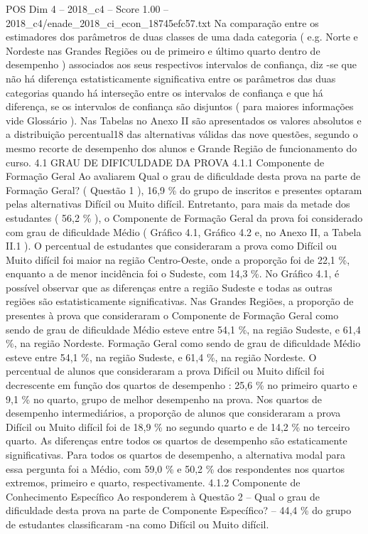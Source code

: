 \begin{textsample}{POS Dim 4 – 2018\_c4 – Score 1.00 – 2018\_c4/enade\_2018\_ci\_econ\_18745efc57.txt}
Na comparação entre os estimadores dos parâmetros de duas classes de uma dada categoria ( e.g.
Norte e Nordeste nas Grandes Regiões ou de primeiro e último quarto dentro de desempenho ) associados aos seus respectivos intervalos de confiança, diz -se que não há diferença estatisticamente significativa entre os parâmetros das duas categorias quando há interseção entre os intervalos de confiança e que há diferença, se os intervalos de confiança são disjuntos ( para maiores informações vide Glossário ).
Nas Tabelas no Anexo II são apresentados os valores absolutos e a distribuição percentual18 das alternativas válidas das nove questões, segundo o mesmo recorte de desempenho dos alunos e Grande Região de funcionamento do curso. 4.1 GRAU DE DIFICULDADE DA PROVA 4.1.1 Componente de Formação Geral Ao avaliarem Qual o grau de dificuldade desta prova na parte de Formação Geral? ( Questão 1 ), 16,9 \% do grupo de inscritos e presentes optaram pelas alternativas Difícil ou Muito difícil.
Entretanto, para mais da metade dos estudantes ( 56,2 \% ), o Componente de Formação Geral da prova foi considerado com grau de dificuldade Médio ( Gráfico 4.1, Gráfico 4.2 e, no Anexo II, a Tabela II.1 ).
O percentual de estudantes que consideraram a prova como Difícil ou Muito difícil foi maior na região Centro-Oeste, onde a proporção foi de 22,1 \%, enquanto a de menor incidência foi o Sudeste, com 14,3 \%.
No Gráfico 4.1, é possível observar que as diferenças entre a região Sudeste e todas as outras regiões são estatisticamente significativas.
Nas Grandes Regiões, a proporção de presentes à prova que consideraram o Componente de Formação Geral como sendo de grau de dificuldade Médio esteve entre 54,1 \%, na região Sudeste, e 61,4 \%, na região Nordeste.
Formação Geral como sendo de grau de dificuldade Médio esteve entre 54,1 \%, na região Sudeste, e 61,4 \%, na região Nordeste.
O percentual de alunos que consideraram a prova Difícil ou Muito difícil foi decrescente em função dos quartos de desempenho : 25,6 \% no primeiro quarto e 9,1 \% no quarto, grupo de melhor desempenho na prova.
Nos quartos de desempenho intermediários, a proporção de alunos que consideraram a prova Difícil ou Muito difícil foi de 18,9 \% no segundo quarto e de 14,2 \% no terceiro quarto.
As diferenças entre todos os quartos de desempenho são estaticamente significativas.
Para todos os quartos de desempenho, a alternativa modal para essa pergunta foi a Médio, com 59,0 \% e 50,2 \% dos respondentes nos quartos extremos, primeiro e quarto, respectivamente. 4.1.2 Componente de Conhecimento Específico Ao responderem à Questão 2 – Qual o grau de dificuldade desta prova na parte de Componente Específico? – 44,4 \% do grupo de estudantes classificaram -na como Difícil ou Muito difícil.

\end{textsample}
